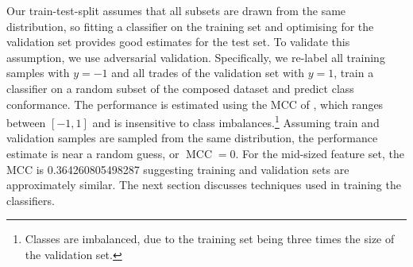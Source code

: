 Our train-test-split assumes that all subsets are drawn from the same distribution, so fitting a classifier on the training set and optimising for the validation set provides good estimates for the test set. To validate this assumption, we use adversarial validation. Specifically, we re-label all training samples with $y=-1$ and all trades of the validation set with $y=1$, train a classifier on a random subset of the composed dataset and predict class conformance. The performance is estimated using the \gls{MCC} of \textcite[][445]{matthewsComparisonPredictedObserved1975}, which ranges between $\left[-1, 1\right]$ and is insensitive to class imbalances.\footnote{Classes are imbalanced, due to the training set being three times the size of the validation set.} Assuming train and validation samples are sampled from the same distribution, the performance estimate is near a random guess, or $\operatorname{MCC} = 0$. For the mid-sized feature set, the \gls{MCC} is \num{0.364260805498287} suggesting training and validation sets are approximately similar. The next section discusses techniques used in training the classifiers.